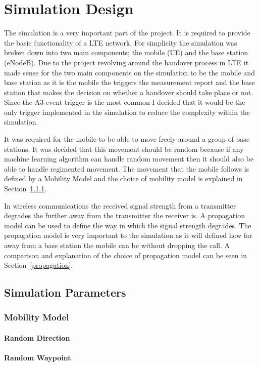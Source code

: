 \chapter{Simulation Design}
The simulation is a very important part of the project. It is required to provide the basic functionality of a LTE network. For simplicity the simulation was broken down into two main components; the mobile (UE) and the base station (eNodeB). Due to the project revolving around the handover process in LTE it made sense for the two main components on the simulation to be the mobile and base station as it is the mobile the triggers the measurement report and the base station that makes the decision on whether a handover should take place or not. Since the A3 event trigger is the most common I decided that it would be the only trigger implemented in the simulation to reduce the complexity within the simulation.

It was required for the mobile to be able to move freely around a group of base stations. It was decided that this movement should be random because if any machine learning algorithm can handle random movement then it should also be able to handle regimented movement. The movement that the mobile follows is defined by a Mobility Model and the choice of mobility model is explained in Section~\ref{mobility}.

In wireless communications the received signal strength from a transmitter degrades the further away from the transmitter the receiver is. A propagation model can be used to define the way in which the signal strength degrades. The propagation model is very important to the simulation as it will defined how far away from a base station the mobile can be without dropping the call. A comparison and explanation of the choice of propagation model can be seen in Section~\ref{propagation}.
\section{Simulation Parameters}

\subsection{Mobility Model}\label{mobility}

\subsubsection{Random Direction}

\subsubsection{Random Waypoint}


